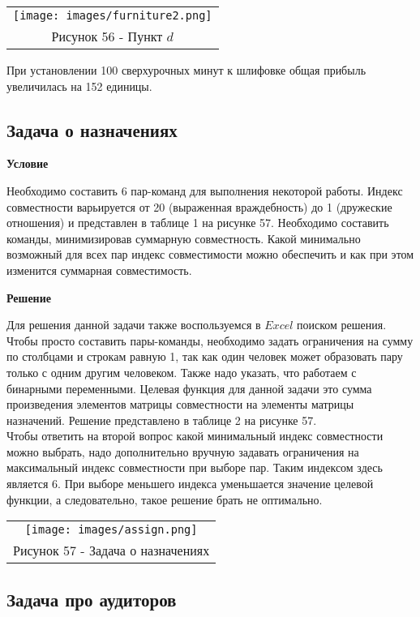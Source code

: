 \documentclass[12pt]{article}
\theoremstyle{definition}
\theoremstyle{remark}
\begin{document}
\begin{center}
  \begin{tabular}{c}
\texttt{[image: images/furniture2.png]}\\
Рисунок 56 - Пункт $d$
\end{tabular}
\end{center}

При установлении 100 сверхурочных минут к шлифовке общая прибыль увеличилась на 152 единицы.

\subsection{Задача о назначениях}
\textbf{Условие}

Необходимо составить 6 пар-команд для выполнения некоторой работы. Индекс совместности варьируется от 20 (выраженная враждебность) до 1 (дружеские отношения) и представлен в таблице 1 на рисунке 57. Необходимо составить команды, минимизировав суммарную совместность. Какой минимально возможный для всех пар индекс совместимости можно обеспечить и как при этом изменится суммарная совместимость.

\textbf{Решение}

Для решения данной задачи также воспользуемся в $Excel$ поиском решения. Чтобы просто составить пары-команды, необходимо задать ограничения на сумму по столбцами и строкам равную 1, так как один человек может образовать пару только с одним другим человеком. Также надо указать, что работаем с бинарными переменными. Целевая функция для данной задачи это сумма произведения элементов матрицы совместности на элементы матрицы назначений. Решение представлено в таблице 2 на рисунке 57.\\

Чтобы ответить на второй вопрос какой минимальный индекс совместности можно выбрать, надо дополнительно вручную задавать ограничения на максимальный индекс совместности при выборе пар. Таким индексом здесь является 6. При выборе меньшего индекса уменьшается значение целевой функции, а следовательно, такое решение брать не оптимально.
\begin{center}
  \begin{tabular}{c}
\texttt{[image: images/assign.png]}\\
Рисунок 57 - Задача о назначениях
\end{tabular}
\end{center}

\subsection{Задача про аудиторов}
\end{document}
